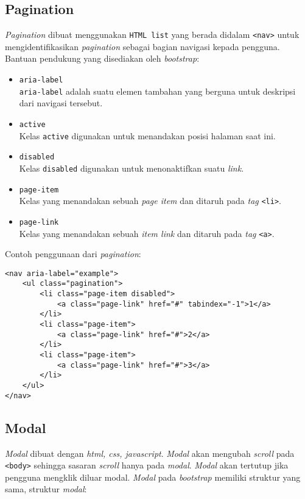 \subsection{Pagination}
\textit{Pagination} dibuat menggunakan \texttt{HTML list} yang berada didalam \texttt{<nav>} untuk mengidentifikasikan \textit{pagination} sebagai bagian navigasi kepada pengguna. Bantuan pendukung yang disediakan oleh \textit{bootstrap}:

\begin{itemize}
	\item \texttt{aria-label} \\
	\texttt{aria-label} adalah suatu elemen tambahan yang berguna untuk deskripsi dari navigasi tersebut.
	\item \texttt{active} \\
	Kelas \texttt{active} digunakan untuk menandakan posisi halaman saat ini.
	\item \texttt{disabled} \\
	Kelas \texttt{disabled} digunakan untuk menonaktifkan suatu \textit{link}.
	\item \texttt{page-item} \\
	Kelas yang menandakan sebuah \textit{page item} dan ditaruh pada \textit{tag} \texttt{<li>}.
	\item \texttt{page-link} \\	
	Kelas yang menandakan sebuah \textit{item link} dan ditaruh pada \textit{tag} \texttt{<a>}.
	
\end{itemize}
Contoh penggunaan dari \textit{pagination}:
	\begin{lstlisting}
<nav aria-label="example">
	<ul class="pagination">
		<li class="page-item disabled">
			<a class="page-link" href="#" tabindex="-1">1</a>
		</li>
		<li class="page-item">
			<a class="page-link" href="#">2</a>
		</li>
		<li class="page-item">
			<a class="page-link" href="#">3</a>
		</li>
	</ul>
</nav>	
\end{lstlisting}




\subsection{Modal}
\textit{Modal} dibuat dengan \textit{html, css, javascript}. \textit{Modal} akan mengubah \textit{scroll} pada \texttt{<body>} sehingga sasaran \textit{scroll} hanya pada \textit{modal}. \textit{Modal} akan tertutup jika pengguna mengklik diluar modal. \textit{Modal} pada \textit{bootstrap} memiliki struktur yang sama, struktur \textit{modal}:

